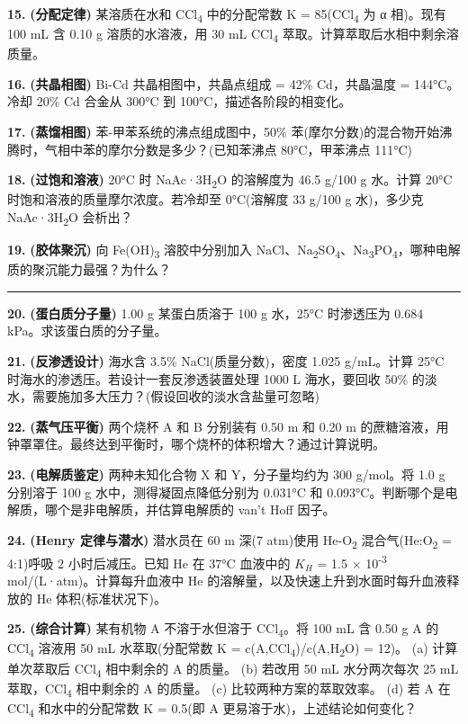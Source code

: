 \textbf{15.} \textbf{(分配定律)} 某溶质在水和 CCl\textsubscript{4} 中的分配常数 K = 85(CCl\textsubscript{4} 为 α 相)。现有 100 mL 含 0.10 g 溶质的水溶液，用 30 mL CCl\textsubscript{4} 萃取。计算萃取后水相中剩余溶质量。

\textbf{16.} \textbf{(共晶相图)} Bi-Cd 共晶相图中，共晶点组成 = 42\% Cd，共晶温度 = 144°C。冷却 20\% Cd 合金从 300°C 到 100°C，描述各阶段的相变化。

\textbf{17.} \textbf{(蒸馏相图)} 苯-甲苯系统的沸点组成图中，50\% 苯(摩尔分数)的混合物开始沸腾时，气相中苯的摩尔分数是多少？(已知苯沸点 80°C，甲苯沸点 111°C)

\textbf{18.} \textbf{(过饱和溶液)} 20°C 时 NaAc·3H\textsubscript{2}O 的溶解度为 46.5 g/100 g 水。计算 20°C 时饱和溶液的质量摩尔浓度。若冷却至 0°C(溶解度 33 g/100 g 水)，多少克 NaAc·3H\textsubscript{2}O 会析出？

\textbf{19.} \textbf{(胶体聚沉)} 向 Fe(OH)\textsubscript{3} 溶胶中分别加入 NaCl、Na\textsubscript{2}SO\textsubscript{4}、Na\textsubscript{3}PO\textsubscript{4}，哪种电解质的聚沉能力最强？为什么？

\begin{center}\rule{0.5\linewidth}{0.5pt}\end{center}

\textbf{20.} \textbf{(蛋白质分子量)} 1.00 g 某蛋白质溶于 100 g 水，25°C 时渗透压为 0.684 kPa。求该蛋白质的分子量。

\textbf{21.} \textbf{(反渗透设计)} 海水含 3.5\% NaCl(质量分数)，密度 1.025 g/mL。计算 25°C 时海水的渗透压。若设计一套反渗透装置处理 1000 L 海水，要回收 50\% 的淡水，需要施加多大压力？(假设回收的淡水含盐量可忽略)

\textbf{22.} \textbf{(蒸气压平衡)} 两个烧杯 A 和 B 分别装有 0.50 m 和 0.20 m 的蔗糖溶液，用钟罩罩住。最终达到平衡时，哪个烧杯的体积增大？通过计算说明。

\textbf{23.} \textbf{(电解质鉴定)} 两种未知化合物 X 和 Y，分子量均约为 300 g/mol。将 1.0 g 分别溶于 100 g 水中，测得凝固点降低分别为 0.031°C 和 0.093°C。判断哪个是电解质，哪个是非电解质，并估算电解质的 van't Hoff 因子。

\textbf{24.} \textbf{(Henry 定律与潜水)} 潜水员在 60 m 深(7 atm)使用 He-O\textsubscript{2} 混合气(He:O\textsubscript{2} = 4:1)呼吸 2 小时后减压。已知 He 在 37°C 血液中的 \(K_H\) = 1.5 × 10\textsuperscript{-3} mol/(L·atm)。计算每升血液中 He 的溶解量，以及快速上升到水面时每升血液释放的 He 体积(标准状况下)。

\textbf{25.} \textbf{(综合计算)} 某有机物 A 不溶于水但溶于 CCl\textsubscript{4}。将 100 mL 含 0.50 g A 的 CCl\textsubscript{4} 溶液用 50 mL 水萃取(分配常数 K = c(A,CCl\textsubscript{4})/c(A,H\textsubscript{2}O) = 12)。
(a) 计算单次萃取后 CCl\textsubscript{4} 相中剩余的 A 的质量。
(b) 若改用 50 mL 水分两次每次 25 mL 萃取，CCl\textsubscript{4} 相中剩余的 A 的质量。
(c) 比较两种方案的萃取效率。
(d) 若 A 在 CCl\textsubscript{4} 和水中的分配常数 K = 0.5(即 A 更易溶于水)，上述结论如何变化？

